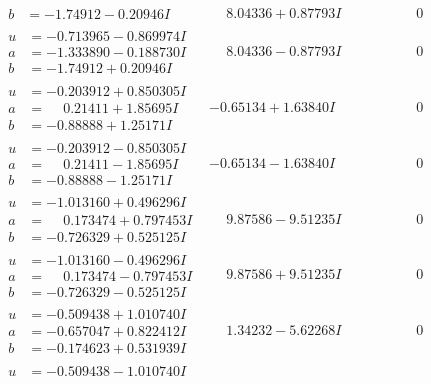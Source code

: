 \documentclass[1p]{elsarticle_modified}
\theoremstyle{definition}
\begin{document}
$$\begin{array}{c|c|c}
\begin{aligned}
b &= -1.74912 - 0.20946 I\end{aligned}
 & \phantom{-}8.04336 + 0.87793 I & \phantom{-0.000000 } 0 \\ \hline\begin{aligned}
u &= -0.713965 - 0.869974 I \\
a &= -1.333890 - 0.188730 I \\
b &= -1.74912 + 0.20946 I\end{aligned}
 & \phantom{-}8.04336 - 0.87793 I & \phantom{-0.000000 } 0 \\ \hline\begin{aligned}
u &= -0.203912 + 0.850305 I \\
a &= \phantom{-}0.21411 + 1.85695 I \\
b &= -0.88888 + 1.25171 I\end{aligned}
 & -0.65134 + 1.63840 I & \phantom{-0.000000 } 0 \\ \hline\begin{aligned}
u &= -0.203912 - 0.850305 I \\
a &= \phantom{-}0.21411 - 1.85695 I \\
b &= -0.88888 - 1.25171 I\end{aligned}
 & -0.65134 - 1.63840 I & \phantom{-0.000000 } 0 \\ \hline\begin{aligned}
u &= -1.013160 + 0.496296 I \\
a &= \phantom{-}0.173474 + 0.797453 I \\
b &= -0.726329 + 0.525125 I\end{aligned}
 & \phantom{-}9.87586 - 9.51235 I & \phantom{-0.000000 } 0 \\ \hline\begin{aligned}
u &= -1.013160 - 0.496296 I \\
a &= \phantom{-}0.173474 - 0.797453 I \\
b &= -0.726329 - 0.525125 I\end{aligned}
 & \phantom{-}9.87586 + 9.51235 I & \phantom{-0.000000 } 0 \\ \hline\begin{aligned}
u &= -0.509438 + 1.010740 I \\
a &= -0.657047 + 0.822412 I \\
b &= -0.174623 + 0.531939 I\end{aligned}
 & \phantom{-}1.34232 - 5.62268 I & \phantom{-0.000000 } 0 \\ \hline\begin{aligned}
u &= -0.509438 - 1.010740 I \\

\end{aligned}
\end{array}$$
\end{document}
